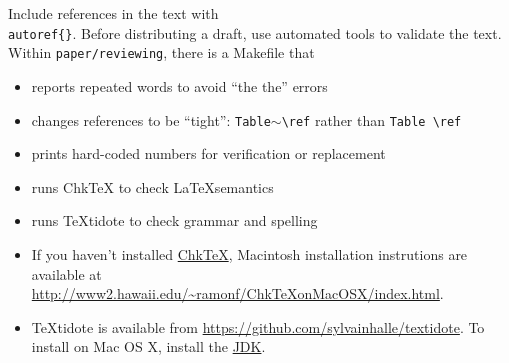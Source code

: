 Include references in the text with \texttt{\\autoref\{\}}.
Before distributing a draft, use automated tools to validate the text. 
Within \texttt{paper/reviewing}, there is a Makefile that
\begin{itemize}
	\item reports repeated words to avoid ``the the'' errors
	\item changes references to be ``tight'': \texttt{Table$\scriptstyle\sim$\textbackslash{}ref} rather than \texttt{Table \textbackslash{}ref}
	\item prints hard-coded numbers for verification or replacement
	\item runs ChkTeX to check \LaTeX semantics
	\item runs TeXtidote to check grammar and spelling
\end{itemize}

\begin{itemize}
\item 
If you haven't installed \href{https://ctan.org/pkg/chktex?lang=en}{ChkTeX}, Macintosh installation instrutions are available at \url{http://www2.hawaii.edu/~ramonf/ChkTeXonMacOSX/index.html}.
\item
TeXtidote is available from \url{https://github.com/sylvainhalle/textidote}.
To install on Mac OS X, install the \href{https://www.oracle.com/technetwork/java/javase/downloads/jdk8-downloads-2133151.html}{JDK}.
\end{itemize}
